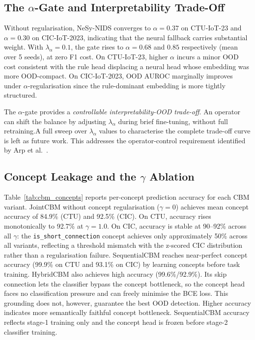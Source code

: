 \documentclass[journal]{IEEEtran}
\begin{document}
\subsection{The \texorpdfstring{$\alpha$}{alpha}-Gate and Interpretability Trade-Off}

Without regularisation, NeSy-NIDS converges to $\alpha{=}0.37$ on
CTU-IoT-23 and $\alpha{=}0.30$ on CIC-IoT-2023, indicating that the
neural fallback carries substantial weight. With $\lambda_\alpha{=}0.1$,
the gate rises to $\alpha{=}0.68$ and $0.85$ respectively
(mean over 5 seeds), at zero F1 cost. On CTU-IoT-23, higher $\alpha$ incurs a minor OOD cost consistent with the rule head displacing a
neural head whose embedding was more OOD-compact. On CIC-IoT-2023, OOD
AUROC marginally improves under $\alpha$-regularisation since the rule-dominant embedding is more tightly
structured.

The $\alpha$-gate provides a \emph{controllable interpretability-OOD trade-off}. An operator can shift the balance by adjusting $\lambda_\alpha$ during brief fine-tuning, without full retraining.A full sweep over $\lambda_\alpha$ values to characterise the complete trade-off curve is left as future work. This addresses the operator-control requirement identified by Arp et al.~\cite{arp2022dos}.

\subsection{Concept Leakage and the \texorpdfstring{$\gamma$}{gamma} Ablation}
\label{sec:leakage}

Table~\ref{tab:cbm_concepts} reports per-concept prediction accuracy
for each CBM variant. JointCBM without concept regularisation ($\gamma{=}0$)
achieves mean concept accuracy of 84.9\% (CTU) and 92.5\% (CIC). On
CTU, accuracy rises monotonically to 92.7\% at $\gamma{=}1.0$. On CIC,
accuracy is stable at 90--92\% across all $\gamma$: the
\texttt{is\_short\_connection} concept achieves only approximately 50\%
across all variants, reflecting a threshold mismatch with the z-scored
CIC distribution rather than a regularisation failure. SequentialCBM reaches near-perfect concept accuracy (99.9\% on CTU  and 93.1\% on CIC) by learning concepts before task training. HybridCBM also achieves
high accuracy (99.6\%/92.9\%). Its skip connection lets the classifier
bypass the concept bottleneck, so the concept head faces no classification
pressure and can freely minimise the BCE loss. This grounding does not,
however, guarantee the best OOD detection. Higher accuracy indicates more semantically faithful concept bottleneck. SequentialCBM accuracy reflects stage-1 training only and the concept head is frozen before stage-2 classifier training.
\end{document}
